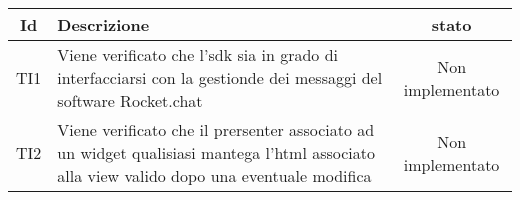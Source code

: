 \begin{center}
	\begin{longtable}{|c|>{\centering}m{7cm}|c|}\hline
		Id & Descrizione & stato \\ \hline
		TI1 & Viene verificato che l'sdk sia in grado di interfacciarsi con la gestionde dei messaggi del software Rocket.chat & Non implementato \\ \hline
		TI2 & Viene verificato che il prersenter associato ad un widget qualisiasi mantega l'html associato alla view valido dopo una eventuale modifica & Non implementato \\ \hline
	\end{longtable}
\end{center}
